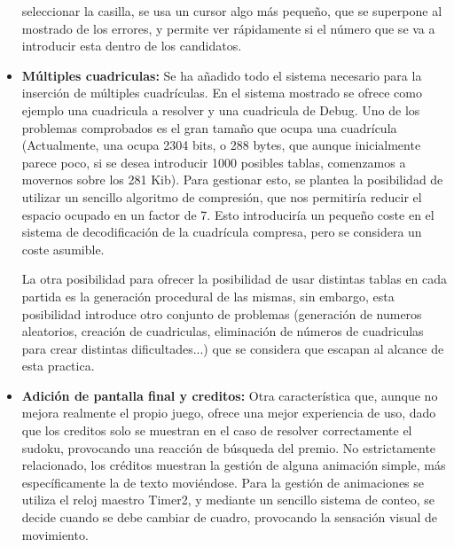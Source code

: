 \documentclass[12pt,letterpaper]{article}
\begin{document}
\begin{itemize}
    seleccionar la casilla, se usa un cursor algo más pequeño, que se
    superpone al mostrado de los errores, y permite ver rápidamente si
    el número que se va a introducir esta dentro de los candidatos.
  \item \textbf{Múltiples cuadriculas:} Se ha añadido todo el sistema
    necesario para la inserción de múltiples cuadrículas. En el
    sistema mostrado se ofrece como ejemplo una cuadricula a resolver
    y una cuadricula de Debug. Uno de los problemas comprobados es el
    gran tamaño que ocupa una cuadrícula (Actualmente, una ocupa 2304
    bits, o 288 bytes, que aunque inicialmente parece poco, si se
    desea introducir 1000 posibles tablas, comenzamos a movernos sobre
    los 281 Kib). Para gestionar esto, se plantea la posibilidad de
    utilizar un sencillo algoritmo de compresión, que nos permitiría
    reducir el espacio ocupado en un factor de 7\footnotemark. Esto
    introduciría un pequeño coste en el sistema de decodificación de
    la cuadrícula compresa, pero se considera un coste asumible.

    
    La otra posibilidad para ofrecer la posibilidad de usar distintas
    tablas en cada partida es la generación procedural de las mismas,
    sin embargo, esta posibilidad introduce otro conjunto de problemas
    (generación de numeros aleatorios, creación de cuadriculas,
    eliminación de números de cuadriculas para crear distintas
    dificultades...)  que se considera que escapan al alcance de esta
    practica.
  \item \textbf{Adición de pantalla final y creditos:} Otra
    característica que, aunque no mejora realmente el propio juego,
    ofrece una mejor experiencia de uso, dado que los creditos solo se
    muestran en el caso de resolver correctamente el sudoku,
    provocando una reacción de búsqueda del premio. No estrictamente
    relacionado, los créditos muestran la gestión de alguna animación
    simple, más específicamente la de texto moviéndose. Para la
    gestión de animaciones se utiliza el reloj maestro Timer2, y
    mediante un sencillo sistema de conteo, se decide cuando se debe
    cambiar de cuadro, provocando la sensación visual de movimiento.
\end{itemize}
\end{document}
